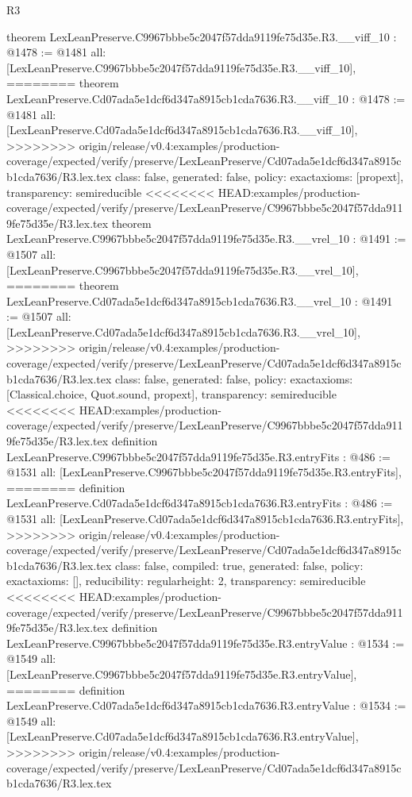 \begin{lexlean}{R3}
\begin{coremodule}
{{{{{{{theorem LexLeanPreserve.C9967bbbe5c2047f57dda9119fe75d35e.R3.__viff_10 : @1478 := @1481 {
  all: [LexLeanPreserve.C9967bbbe5c2047f57dda9119fe75d35e.R3.__viff_10],
========
theorem LexLeanPreserve.Cd07ada5e1dcf6d347a8915cb1cda7636.R3.__viff_10 : @1478 := @1481 {
  all: [LexLeanPreserve.Cd07ada5e1dcf6d347a8915cb1cda7636.R3.__viff_10],
>>>>>>>> origin/release/v0.4:examples/production-coverage/expected/verify/preserve/LexLeanPreserve/Cd07ada5e1dcf6d347a8915cb1cda7636/R3.lex.tex
  class: false,
  generated: false,
  policy: exact{axioms: [propext]},
  transparency: semireducible
}
<<<<<<<< HEAD:examples/production-coverage/expected/verify/preserve/LexLeanPreserve/C9967bbbe5c2047f57dda9119fe75d35e/R3.lex.tex
theorem LexLeanPreserve.C9967bbbe5c2047f57dda9119fe75d35e.R3.__vrel_10 : @1491 := @1507 {
  all: [LexLeanPreserve.C9967bbbe5c2047f57dda9119fe75d35e.R3.__vrel_10],
========
theorem LexLeanPreserve.Cd07ada5e1dcf6d347a8915cb1cda7636.R3.__vrel_10 : @1491 := @1507 {
  all: [LexLeanPreserve.Cd07ada5e1dcf6d347a8915cb1cda7636.R3.__vrel_10],
>>>>>>>> origin/release/v0.4:examples/production-coverage/expected/verify/preserve/LexLeanPreserve/Cd07ada5e1dcf6d347a8915cb1cda7636/R3.lex.tex
  class: false,
  generated: false,
  policy: exact{axioms: [Classical.choice, Quot.sound, propext]},
  transparency: semireducible
}
<<<<<<<< HEAD:examples/production-coverage/expected/verify/preserve/LexLeanPreserve/C9967bbbe5c2047f57dda9119fe75d35e/R3.lex.tex
definition LexLeanPreserve.C9967bbbe5c2047f57dda9119fe75d35e.R3.entryFits : @486 := @1531 {
  all: [LexLeanPreserve.C9967bbbe5c2047f57dda9119fe75d35e.R3.entryFits],
========
definition LexLeanPreserve.Cd07ada5e1dcf6d347a8915cb1cda7636.R3.entryFits : @486 := @1531 {
  all: [LexLeanPreserve.Cd07ada5e1dcf6d347a8915cb1cda7636.R3.entryFits],
>>>>>>>> origin/release/v0.4:examples/production-coverage/expected/verify/preserve/LexLeanPreserve/Cd07ada5e1dcf6d347a8915cb1cda7636/R3.lex.tex
  class: false,
  compiled: true,
  generated: false,
  policy: exact{axioms: []},
  reducibility: regular{height: 2},
  transparency: semireducible
}
<<<<<<<< HEAD:examples/production-coverage/expected/verify/preserve/LexLeanPreserve/C9967bbbe5c2047f57dda9119fe75d35e/R3.lex.tex
definition LexLeanPreserve.C9967bbbe5c2047f57dda9119fe75d35e.R3.entryValue : @1534 := @1549 {
  all: [LexLeanPreserve.C9967bbbe5c2047f57dda9119fe75d35e.R3.entryValue],
========
definition LexLeanPreserve.Cd07ada5e1dcf6d347a8915cb1cda7636.R3.entryValue : @1534 := @1549 {
  all: [LexLeanPreserve.Cd07ada5e1dcf6d347a8915cb1cda7636.R3.entryValue],
>>>>>>>> origin/release/v0.4:examples/production-coverage/expected/verify/preserve/LexLeanPreserve/Cd07ada5e1dcf6d347a8915cb1cda7636/R3.lex.tex
}}}}}}}}}}}}
\end{coremodule}
\end{lexlean}
